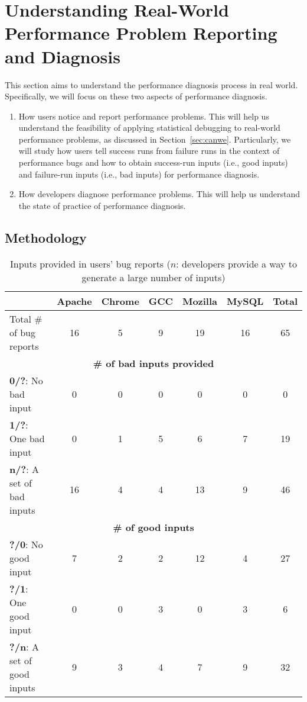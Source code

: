 \section{Understanding Real-World Performance Problem Reporting and Diagnosis}
\label{sec:study}

This section aims to understand the performance diagnosis process
in real world. Specifically, we will focus on these two aspects of
performance diagnosis.

\begin{enumerate}
\item How users notice and report performance problems.
This will help us understand the feasibility of applying statistical debugging
to real-world performance problems, as discussed in 
Section~\ref{sec:canwe}. Particularly, we will study how users
tell success runs from failure
runs in the context of performance bugs and how to obtain
success-run inputs (i.e., good inputs) and failure-run inputs
(i.e., bad inputs) for performance diagnosis.
\item How developers diagnose performance problems.
This will help us understand the state of practice of performance diagnosis.
\end{enumerate}

\subsection{Methodology}



\begin{table*}[tb!]
\begin{adjustwidth}{-.5in}{-.5in}
\scriptsize
\centering
{
\begin{tabular}{lcccccc}
\toprule
&Apache&Chrome&GCC&Mozilla&MySQL&Total\\
\midrule
Total \# of bug reports & 16 & 5 & 9 & 19 & 16 & 65 \\
\midrule
\multicolumn{7}{c}{\bf \# of bad inputs provided}\\
\multicolumn{1}{l}{{\bf 0/?}: No bad input }
&0&0&0&0&0&0\\
\multicolumn{1}{l}{{\bf 1/?}: One bad input}
&0&1&5&6&7&19\\
\multicolumn{1}{l}{{\bf n/?}: A set of bad inputs}
&16&4&4&13&9&46\\
\midrule
\multicolumn{7}{c}{\bf \# of good inputs}\\
\multicolumn{1}{l}{{\bf ?/0}: No good input}
&7&2&2&12&4&27\\
\multicolumn{1}{l}{{\bf ?/1}: One good input}
&0&0&3&0&3&6\\
\multicolumn{1}{l}{{\bf ?/n}: A set of good inputs}
&9&3&4&7&9&32\\
\bottomrule
\end{tabular}
}
\end{adjustwidth}
\caption{Inputs provided in users' bug reports ($n$: 
developers provide a way to generate a large number of inputs)}
\label{tab:input}
\end{table*}



